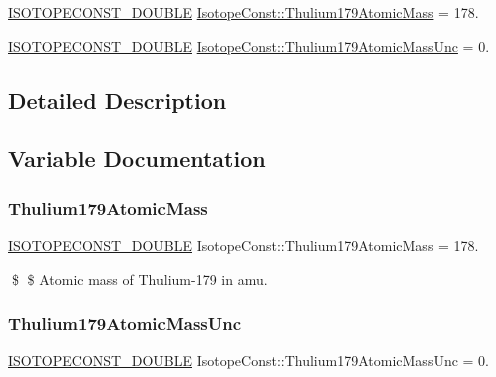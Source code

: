 \begin{DoxyCompactItemize}
\item 
\mbox{\hyperlink{group___isotope_const-_macros_ga8f45a7272ce02c0b4c65c44636ed719a}{I\+S\+O\+T\+O\+P\+E\+C\+O\+N\+S\+T\+\_\+\+D\+O\+U\+B\+LE}} \mbox{\hyperlink{group___isotope_const-_thulium-_tm179_gaa7b00be1821597f403323041b244ac97}{Isotope\+Const\+::\+Thulium179\+Atomic\+Mass}} = 178.
\item 
\mbox{\hyperlink{group___isotope_const-_macros_ga8f45a7272ce02c0b4c65c44636ed719a}{I\+S\+O\+T\+O\+P\+E\+C\+O\+N\+S\+T\+\_\+\+D\+O\+U\+B\+LE}} \mbox{\hyperlink{group___isotope_const-_thulium-_tm179_ga07ea3b3aacd106e1c31ba0efb27fa353}{Isotope\+Const\+::\+Thulium179\+Atomic\+Mass\+Unc}} = 0.
\end{DoxyCompactItemize}


\subsection{Detailed Description}


\subsection{Variable Documentation}
\mbox{\label{group___isotope_const-_thulium-_tm179_gaa7b00be1821597f403323041b244ac97}} 
\subsubsection{\texorpdfstring{Thulium179\+Atomic\+Mass}{Thulium179AtomicMass}}
{\footnotesize\ttfamily \mbox{\hyperlink{group___isotope_const-_macros_ga8f45a7272ce02c0b4c65c44636ed719a}{I\+S\+O\+T\+O\+P\+E\+C\+O\+N\+S\+T\+\_\+\+D\+O\+U\+B\+LE}} Isotope\+Const\+::\+Thulium179\+Atomic\+Mass = 178.}

\$ \$ Atomic mass of Thulium-\/179 in amu. \mbox{\label{group___isotope_const-_thulium-_tm179_ga07ea3b3aacd106e1c31ba0efb27fa353}} 
\subsubsection{\texorpdfstring{Thulium179\+Atomic\+Mass\+Unc}{Thulium179AtomicMassUnc}}
{\footnotesize\ttfamily \mbox{\hyperlink{group___isotope_const-_macros_ga8f45a7272ce02c0b4c65c44636ed719a}{I\+S\+O\+T\+O\+P\+E\+C\+O\+N\+S\+T\+\_\+\+D\+O\+U\+B\+LE}} Isotope\+Const\+::\+Thulium179\+Atomic\+Mass\+Unc = 0.}

